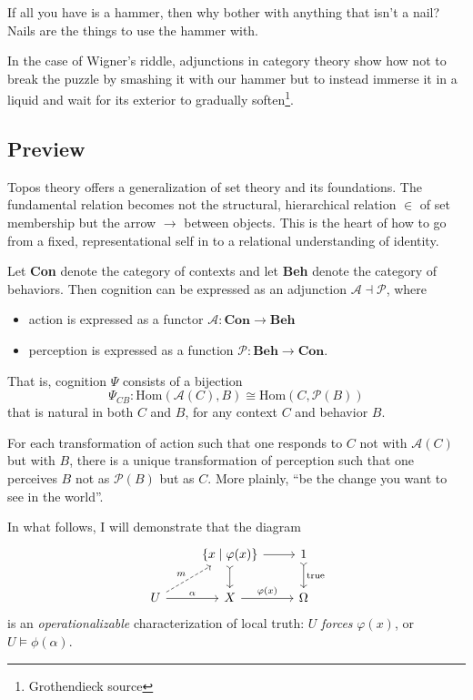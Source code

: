 \documentclass{article}
\begin{document}
If all you have is a hammer, then why bother with anything that isn't a nail? Nails are the things to use the hammer with.

In the case of Wigner's riddle, adjunctions in category theory show how not to break the puzzle by smashing it with our hammer but to instead immerse it in a liquid and wait for its exterior to gradually soften\footnote{Grothendieck source}.

\subsection{Preview}

Topos theory offers a generalization of set theory and its foundations. The fundamental relation becomes not the structural, hierarchical relation $\in$ of set membership but the arrow $\to$ between objects. This is the heart of how to go from a fixed, representational self in to a relational understanding of identity.

Let \textbf{Con} denote the category of contexts and let \textbf{Beh} denote the category of behaviors. Then cognition can be expressed as an adjunction $\mathcal{A} \dashv \mathcal{P}$, where

\begin{itemize}
    \item action is expressed as a functor $\mathcal{A} \colon \textbf{Con} \to \textbf{Beh}$
    \item perception is expressed as a function $\mathcal{P} \colon \textbf{Beh} \to \textbf{Con}$.
\end{itemize}

That is, cognition $\Psi$ consists of a bijection
\[
    \Psi_{CB} \colon \text{Hom} ( \mathcal{A}(C), B ) \cong \text{Hom}(C, \mathcal{P}(B))
\]
that is natural in both $C$ and $B$, for any context $C$ and behavior $B$.

For each transformation of action such that one responds to $C$ not with $\mathcal{A}(C)$ but with $B$, there is a unique transformation of perception such that one perceives $B$ not as $\mathcal{P}(B)$ but as $C$. More plainly, ``be the change you want to see in the world''.

In what follows, I will demonstrate that the diagram
\[
    \begin{tikzcd}
        & \{ x \mid \varphi(x) \}  \arrow[r] \arrow[d, tail] & 1 \arrow[d, tail, "\text{true}"] \\
        U \arrow[r, "\alpha"] \arrow[ru, dashed, "m"] & X \arrow[r, "\varphi(x)"] & \Omega
    \end{tikzcd}
\]
is an \emph{operationalizable} characterization of local truth: $U$ \emph{forces} $\varphi(x)$, or $U \vDash \phi(\alpha)$.
\end{document}
